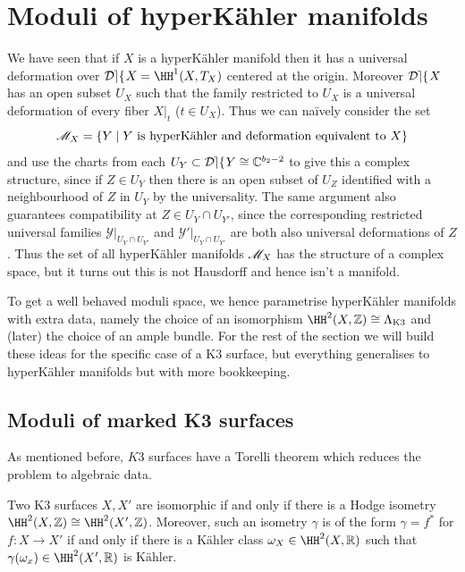 \section{Moduli of hyperK\"ahler manifolds}
We have seen that if \(X\) is a hyperK\"ahler manifold then it has a universal
deformation over \(\Def X = \HH^1(X,T_X)\) centered at the origin. Moreover
\(\mathop{\mathcal{D\kern -0.5pt e\kern -0.5pt f\kern -1pt}} X\) has an open subset \(U_X\) such that the family restricted to \(U_X\)
is a universal deformation of every fiber \(X|_t\) (\(t\in U_X\)). Thus we can
na\"ively consider the set
\[
    \mathscr{M}_X=\{Y\;|\; Y\text{ is hyperK\"ahler and deformation equivalent to
    }X\}
\]
and use the charts from each \(U_Y\subset \mathop{\mathcal{D\kern -0.5pt e\kern -0.5pt f\kern -1pt}} Y \cong \mathbb{C}^{b_2-2}\) to
give this a complex structure, since if \(Z\in U_Y\) then there is an
open subset of \(U_Z\) identified with a neighbourhood of \(Z\) in \(U_Y\) by
the universality. The same argument also guarantees compatibility at \(Z\in
U_Y\cap U_{Y'}\), since the corresponding restricted universal families
\(\mathcal{Y}|_{U_Y\cap U_{Y'}}\) and \(\mathcal{Y}'|_{U_Y\cap U_{Y'}}\) are
both also universal deformations of \(Z\). Thus the set of all hyperK\"ahler
manifolds \(\mathscr{M}_X\) has the structure of a complex space, but it turns out
this is not Hausdorff and hence isn't a manifold.

To get a well behaved moduli space, we hence parametrise hyperK\"ahler
manifolds with extra data, namely the choice of an isomorphism
\(\HH^2(X,\mathbb{Z})\cong \Lambda_\text{K3}\) and (later) the choice of an
ample bundle. For the rest of the section we will build these ideas for the
specific case of a K3 surface, but everything generalises to hyperK\"ahler
manifolds but with more bookkeeping.

\subsection{Moduli of marked K3 surfaces} As mentioned before, \(K3\) surfaces
have a Torelli theorem which reduces the problem to algebraic data.

\begin{theorem}
    Two K3 surfaces \(X,X'\)  are isomorphic if and only if there is a Hodge
    isometry \(\HH^2(X,\mathbb{Z})\cong \HH^2(X',\mathbb{Z})\). Moreover,
    such an isometry \(\gamma\) is of the form \(\gamma=f^\ast\) for \(f:X\to
    X'\) if and only if there is a K\"ahler class \(\omega_X\in
    \HH^2(X,\mathbb{R})\) such that \(\gamma(\omega_x)\in \HH^2(X',\mathbb{R})\)
    is K\"ahler.
\end{theorem}

